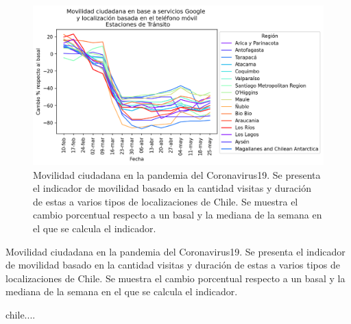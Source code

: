 \documentclass{article}
\begin{document}
\begin{figure}[H]
	\centering
	\begin{adjustbox}{width=0.8\textwidth}
		\includegraphics{./chile_media.png} %
	\end{adjustbox}
	\caption{Movilidad ciudadana en la pandemia del Coronavirus19. Se presenta el indicador de movilidad basado en la cantidad visitas y duración de estas a varios tipos de localizaciones de Chile. Se muestra el cambio porcentual respecto a un basal y la mediana de la semana en el que se calcula el indicador. }
	\label{fig:movilidad chile}
\end{figure}


\begin{table}[H]
	\begin{adjustbox}{width=1\textwidth}
	\end{adjustbox}
	\caption{Movilidad ciudadana en la pandemia del Coronavirus19. Se presenta el indicador de movilidad basado en la cantidad visitas y duración de estas a varios tipos de localizaciones de Chile. Se muestra el cambio porcentual respecto a un basal y la mediana de la semana en el que se calcula el indicador. }
	\label{tab:movilidad chile}
\end{table}


chile....
\end{document}
